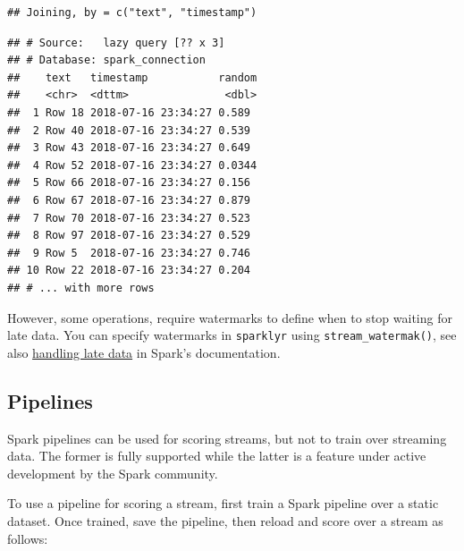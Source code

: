 \documentclass[]{book}
\newenvironment{Shaded}{\begin{snugshade}}{\end{snugshade}}
\newcommand{\KeywordTok}[1]{\textcolor[rgb]{0.13,0.29,0.53}{\textbf{#1}}}
\newcommand{\NormalTok}[1]{#1}
\newcommand{\OperatorTok}[1]{\textcolor[rgb]{0.81,0.36,0.00}{\textbf{#1}}}
\newcommand{\StringTok}[1]{\textcolor[rgb]{0.31,0.60,0.02}{#1}}
\theoremstyle{definition}
\theoremstyle{definition}
\theoremstyle{definition}
\theoremstyle{remark}
\begin{document}
\begin{verbatim}
## Joining, by = c("text", "timestamp")
\end{verbatim}

\begin{verbatim}
## # Source:   lazy query [?? x 3]
## # Database: spark_connection
##    text   timestamp           random
##    <chr>  <dttm>               <dbl>
##  1 Row 18 2018-07-16 23:34:27 0.589 
##  2 Row 40 2018-07-16 23:34:27 0.539 
##  3 Row 43 2018-07-16 23:34:27 0.649 
##  4 Row 52 2018-07-16 23:34:27 0.0344
##  5 Row 66 2018-07-16 23:34:27 0.156 
##  6 Row 67 2018-07-16 23:34:27 0.879 
##  7 Row 70 2018-07-16 23:34:27 0.523 
##  8 Row 97 2018-07-16 23:34:27 0.529 
##  9 Row 5  2018-07-16 23:34:27 0.746 
## 10 Row 22 2018-07-16 23:34:27 0.204 
## # ... with more rows
\end{verbatim}

However, some operations, require watermarks to define when to stop
waiting for late data. You can specify watermarks in \texttt{sparklyr}
using \texttt{stream\_watermak()}, see also
\href{https://spark.apache.org/docs/latest/structured-streaming-programming-guide.html\#handling-late-data-and-watermarking}{handling
late data} in Spark's documentation.

\hypertarget{streams-pipelines}{%
\subsection{Pipelines}\label{streams-pipelines}}

Spark pipelines can be used for scoring streams, but not to train over
streaming data. The former is fully supported while the latter is a
feature under active development by the Spark community.

To use a pipeline for scoring a stream, first train a Spark pipeline
over a static dataset. Once trained, save the pipeline, then reload and
score over a stream as follows:

\begin{Shaded}
\end{Shaded}
\end{document}
